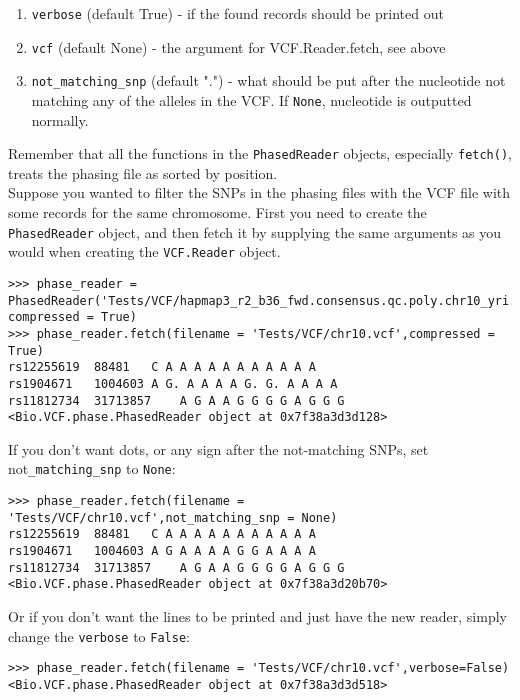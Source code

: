 \begin{enumerate}
  \item \verb|verbose| (default True) - if the found records should be printed out
  \item \verb|vcf| (default None) - the argument for VCF.Reader.fetch, see above
  \item \verb|not_matching_snp| (default ".") - what should be put after the nucleotide not matching any of the alleles in the VCF.
  If \verb|None|, nucleotide is outputted normally.
\end{enumerate}

\noindent Remember that all the functions in the \verb|PhasedReader| objects, especially \verb|fetch()|, treats the phasing file as sorted by position.
\\

\noindent Suppose you wanted to filter the SNPs in the phasing files with the VCF file with some records for the same chromosome.
First you need to create the \verb|PhasedReader| object, and then fetch it by supplying the same arguments as you would when creating the \verb|VCF.Reader| object.

\begin{verbatim}
>>> phase_reader = PhasedReader('Tests/VCF/hapmap3_r2_b36_fwd.consensus.qc.poly.chr10_yri.D.phased.gz',
compressed = True)
>>> phase_reader.fetch(filename = 'Tests/VCF/chr10.vcf',compressed = True)
rs12255619	88481	C A A A A A A A A A A A
rs1904671	1004603	A G. A A A A G. G. A A A A
rs11812734	31713857	A G A A G G G G A G G G
<Bio.VCF.phase.PhasedReader object at 0x7f38a3d3d128>
\end{verbatim}

\noindent If you don't want dots, or any sign after the not-matching SNPs, set not\verb|_matching_snp| to \verb|None|:

\begin{verbatim}
>>> phase_reader.fetch(filename = 'Tests/VCF/chr10.vcf',not_matching_snp = None)
rs12255619	88481	C A A A A A A A A A A A
rs1904671	1004603	A G A A A A G G A A A A
rs11812734	31713857	A G A A G G G G A G G G
<Bio.VCF.phase.PhasedReader object at 0x7f38a3d20b70>
\end{verbatim}

\noindent Or if you don't want the lines to be printed and just have the new reader, simply change the \verb|verbose| to \verb|False|:

\begin{verbatim}
>>> phase_reader.fetch(filename = 'Tests/VCF/chr10.vcf',verbose=False)
<Bio.VCF.phase.PhasedReader object at 0x7f38a3d3d518>
\end{verbatim}

